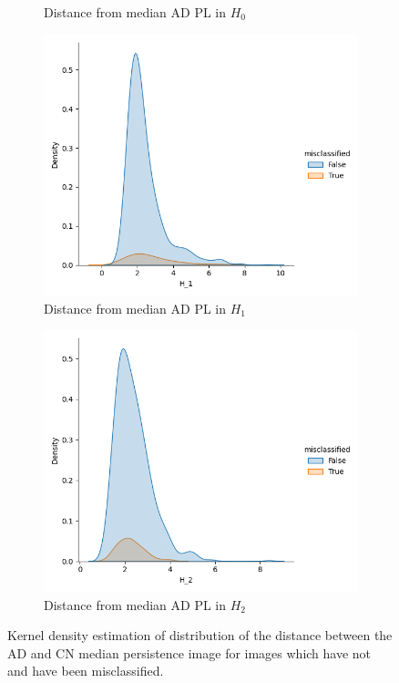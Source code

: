 \documentclass{article}
\begin{document}
\begin{figure}
\begin{subfigure}{0.32\textwidth}
    \caption{Distance from median AD PL in $H_0$}
  \end{subfigure}
  \begin{subfigure}{0.32\textwidth}
    \includegraphics[width=\textwidth]{figures/misclassification_distance/distribution_distance_misclassified_AD_H_1.png}
    \caption{Distance from median AD PL in $H_1$}
  \end{subfigure}
  \begin{subfigure}{0.32\textwidth}
    \includegraphics[width=\textwidth]{figures/misclassification_distance/distribution_distance_misclassified_AD_H_2.png}
    \caption{Distance from median AD PL in $H_2$}
  \end{subfigure}
    \caption{Kernel density estimation of distribution of the distance between the AD and CN median
      persistence image for images which have not and have been misclassified.}
  \label{fig:outlier_misclassified}
\end{figure}
\end{document}
